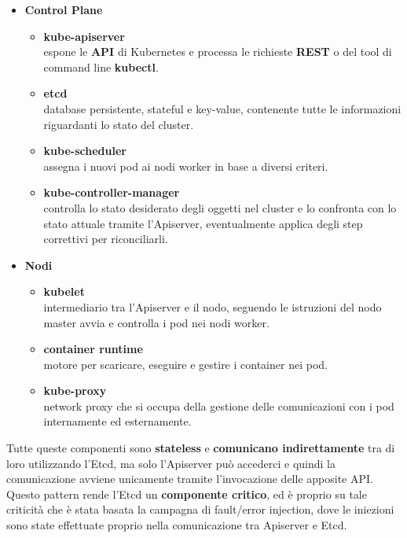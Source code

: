 \begin{itemize}
    \item \textbf{Control Plane}
        \begin{itemize} 
            \item \textbf{kube-apiserver} \\
            espone le \textbf{API} di Kubernetes e processa le richieste \textbf{REST} o del tool di command line \textbf{kubectl}.
            \item \textbf{etcd} \\
            database persistente, stateful e key-value, contenente tutte le informazioni riguardanti lo stato del cluster.
            \item \textbf{kube-scheduler} \\
            assegna i nuovi pod ai nodi worker in base a diversi criteri.
            \item \textbf{kube-controller-manager} \\
            controlla lo stato desiderato degli oggetti nel cluster e lo confronta con lo stato attuale tramite l'Apiserver, eventualmente applica degli step correttivi per riconciliarli.
        \end{itemize}
    \item \textbf{Nodi}
        \begin{itemize} 
            \item \textbf{kubelet} \\
            intermediario tra l'Apiserver e il nodo, seguendo le istruzioni del nodo master avvia e controlla i pod nei nodi worker.
            \item \textbf{container runtime} \\
            motore per scaricare, eseguire e gestire i container nei pod.
            \item \textbf{kube-proxy} \\
            network proxy che si occupa della gestione delle comunicazioni con i pod internamente ed esternamente.
        \end{itemize}
\end{itemize}
Tutte queste componenti sono \textbf{stateless} e \textbf{comunicano indirettamente} tra di loro utilizzando l'Etcd, ma solo l'Apiserver può accederci e quindi la comunicazione avviene unicamente tramite l'invocazione delle apposite API. \\
Questo pattern rende l'Etcd un \textbf{componente critico}, ed è proprio su tale criticità che è stata basata la campagna di fault/error injection, dove le iniezioni sono state effettuate proprio nella comunicazione tra Apiserver e Etcd.

